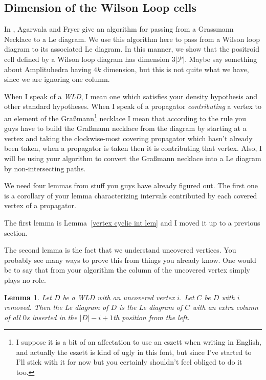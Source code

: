 \documentclass[11pt]{article}
\newcommand{\cP}{\mathcal{P}}
\newtheorem{lem}[thm]{Lemma}
\theoremstyle{remark}
\theoremstyle{definition}
\begin{document}
\subsection{Dimension of the Wilson Loop cells}

In \cite{reversingOh}, Agarwala and Fryer give an algorithm for passing from a Grassmann Necklace to a Le diagram. We use this algorithm here to pass from a Wilson loop diagram to its associated Le diagram. In this manner, we show that the positroid cell defined by a Wilson loop diagram has dimension $3|\cP|$. Maybe say something about Amplituhedra having $4k$ dimension, but this is not quite what we have, since we are ignoring one column.

When I speak of a \emph{WLD}, I mean one which satisfies your density hypothesis and other standard hypotheses.  When I speak of a propagator \emph{contributing} a vertex to an element of the Gra\ss mann\footnote{I suppose it is a bit of an affectation to use an eszett when writing in English, and actually the eszett is kind of ugly in this font, but since I've started to I'll stick with it for now but you certainly shouldn't feel obliged to do it too.} necklace I mean that according to the rule you guys have to build the Gra\ss mann necklace from the diagram by starting at a vertex and taking the clockwise-most covering propagator which hasn't already been taken, when a propagator is taken then it is contributing that vertex.  Also, I will be using your algorithm to convert the Gra\ss mann necklace into a Le diagram by non-intersecting paths.


We need four lemmas from stuff you guys have already figured out.  The first one is a corollary of your lemma characterizing intervals contributed by each covered vertex of a
propagator.

The first lemma is Lemma~\ref{vertex cyclic int lem} and I moved it up to a previous section.

The second lemma is the fact that we understand uncovered vertices.  You probably see many ways to prove this from things you already know.  One would be to say that from your algorithm the column of the uncovered vertex simply plays no role.

\begin{lem}\label{lem uncovered}
  Let $D$ be a WLD with an uncovered vertex $i$.  Let $C$ be $D$ with $i$ removed.  Then the Le diagram of $D$ is the Le diagram of $C$ with an extra column of all $0$s inserted in the $|D|-i+1$th position from the left.
\end{lem}
\end{document}
